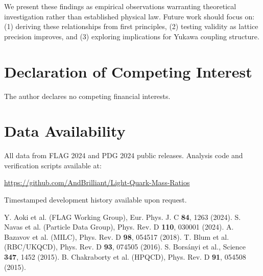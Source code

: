 \documentclass[12pt]{article}
\begin{document}
We present these findings as empirical observations warranting theoretical investigation rather than established physical law. Future work should focus on: (1) deriving these relationships from first principles, (2) testing validity as lattice precision improves, and (3) exploring implications for Yukawa coupling structure.

\section*{Declaration of Competing Interest}
The author declares no competing financial interests.

\section*{Data Availability}
All data from FLAG 2024 and PDG 2024 public releases. Analysis code and verification scripts available at:

\url{https://github.com/AndBrilliant/Light-Quark-Mass-Ratios}

Timestamped development history available upon request.

\begin{thebibliography}{99}

 Y. Aoki et al. (FLAG Working Group), Eur. Phys. J. C \textbf{84}, 1263 (2024).
 S. Navas et al. (Particle Data Group), Phys. Rev. D \textbf{110}, 030001 (2024).
 A. Bazavov et al. (MILC), Phys. Rev. D \textbf{98}, 054517 (2018).
 T. Blum et al. (RBC/UKQCD), Phys. Rev. D \textbf{93}, 074505 (2016).
 S. Borsányi et al., Science \textbf{347}, 1452 (2015).
 B. Chakraborty et al. (HPQCD), Phys. Rev. D \textbf{91}, 054508 (2015).

\end{thebibliography}
\end{document}
